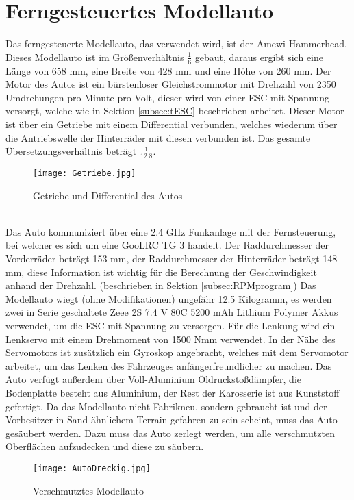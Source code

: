 \section{Ferngesteuertes Modellauto}
\label{sec:Auto}
Das ferngesteuerte Modellauto, das verwendet wird, ist der Amewi Hammerhead. Dieses Modellauto ist im Größenverhältnis $\frac{1}{6}$ gebaut, daraus ergibt sich eine Länge von 658 \ac{mm}, eine Breite von 428 \ac{mm} und eine Höhe von 260 \ac{mm}. Der Motor des Autos ist ein bürstenloser Gleichstrommotor mit Drehzahl von 2350 Umdrehungen pro Minute pro Volt, dieser wird von einer \ac{ESC} mit Spannung versorgt, welche wie in Sektion \ref{subsec:tESC} beschrieben arbeitet. Dieser Motor ist über ein Getriebe mit einem Differential verbunden, welches wiederum über die Antriebswelle der Hinterräder mit diesen verbunden ist. Das gesamte Übersetzungsverhältnis beträgt $\frac{1}{12.8}$.
\begin{figure}[h]
\centering
\texttt{[image: Getriebe.jpg]}
\caption{Getriebe und Differential des Autos}
\label{fig:Getriebe}
\end{figure}
\\
Das Auto kommuniziert über eine 2.4 \ac{GHz} Funkanlage mit der Fernsteuerung, bei welcher es sich um eine GooLRC TG 3 handelt. Der Raddurchmesser der Vorderräder beträgt 153 \ac{mm}, der Raddurchmesser der Hinterräder beträgt 148 \ac{mm}, diese Information ist wichtig für die Berechnung der Geschwindigkeit anhand der Drehzahl. (beschrieben in Sektion \ref{subsec:RPMprogram}) Das Modellauto wiegt (ohne Modifikationen) ungefähr 12.5 Kilogramm, es werden zwei in Serie geschaltete Zeee 2S 7.4 \ac{V} 80C 5200 \ac{mAh} Lithium Polymer Akkus verwendet, um die \ac{ESC} mit Spannung zu versorgen. Für die Lenkung wird ein Lenkservo mit einem Drehmoment von 1500 \ac{Nmm} verwendet. In der Nähe des Servomotors ist zusätzlich ein Gyroskop angebracht, welches mit dem Servomotor arbeitet, um das Lenken des Fahrzeuges anfängerfreundlicher zu machen. Das Auto verfügt außerdem über Voll-Aluminium Öldruckstoßdämpfer, die Bodenplatte besteht aus Aluminium, der Rest der Karosserie ist aus Kunststoff gefertigt.
Da das Modellauto nicht Fabrikneu, sondern gebraucht ist und der Vorbesitzer in Sand-ähnlichem Terrain gefahren zu sein scheint, muss das Auto gesäubert werden. Dazu muss das Auto zerlegt werden, um alle verschmutzten Oberflächen aufzudecken und diese zu säubern. 
\begin{figure}[h]
\centering
\texttt{[image: AutoDreckig.jpg]}
\caption{Verschmutztes Modellauto}
\label{fig:AutoDreckig}
\end{figure}